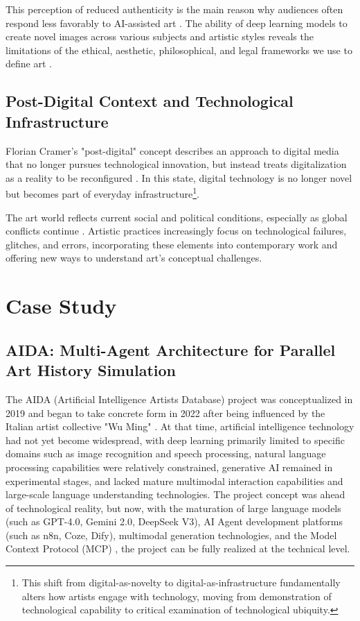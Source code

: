 \documentclass{article}
\begin{document}
This perception of reduced authenticity is the main reason why audiences often respond less favorably to AI-assisted art \cite{messer2024cocreating}. The ability of deep learning models to create novel images across various subjects and artistic styles reveals the limitations of the ethical, aesthetic, philosophical, and legal frameworks we use to define art \cite{cetinic2022understanding}.

\subsection{Post-Digital Context and Technological Infrastructure}
Florian Cramer's "post-digital" concept describes an approach to digital media that no longer pursues technological innovation, but instead treats digitalization as a reality to be reconfigured \cite{cramer2015post}. In this state, digital technology is no longer novel but becomes part of everyday infrastructure\footnote{This shift from digital-as-novelty to digital-as-infrastructure fundamentally alters how artists engage with technology, moving from demonstration of technological capability to critical examination of technological ubiquity.}. 

The art world reflects current social and political conditions, especially as global conflicts continue \cite{rabb2024curators}. Artistic practices increasingly focus on technological failures, glitches, and errors, incorporating these elements into contemporary work and offering new ways to understand art's conceptual challenges.


\section{Case Study}

\subsection{AIDA: Multi-Agent Architecture for Parallel Art History Simulation}

The AIDA (Artificial Intelligence Artists Database) project was conceptualized in 2019 and began to take concrete form in 2022 after being influenced by the Italian artist collective "Wu Ming" \cite{wu_ming_foundation_intro}. At that time, artificial intelligence technology had not yet become widespread, with deep learning primarily limited to specific domains such as image recognition and speech processing, natural language processing capabilities were relatively constrained, generative AI remained in experimental stages, and lacked mature multimodal interaction capabilities and large-scale language understanding technologies. The project concept was ahead of technological reality, but now, with the maturation of large language models (such as GPT-4.0, Gemini 2.0, DeepSeek V3), AI Agent development platforms (such as n8n, Coze, Dify), multimodal generation technologies, and the Model Context Protocol (MCP) \cite{mcp_overview_2025}, the project can be fully realized at the technical level.
\end{document}
